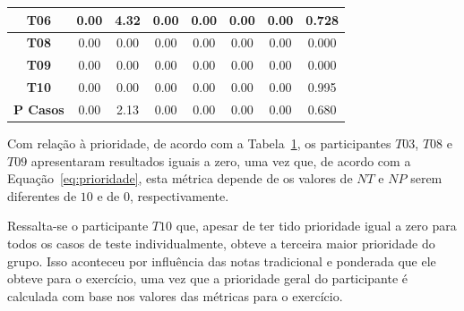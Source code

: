 \begin{table}[htbp]
\begin{tabular}{|c|ccccccc|}
		\textbf{T06} & \multicolumn{1}{c|}{0.00} & \multicolumn{1}{c|}{4.32} & \multicolumn{1}{c|}{0.00} & \multicolumn{1}{c|}{0.00} & \multicolumn{1}{c|}{0.00} & \multicolumn{1}{c|}{0.00} & 0.728 \\ \hline
		\rowcolor[HTML]{F2F2F2} 
		\textbf{T08} & \multicolumn{1}{c|}{\cellcolor[HTML]{F2F2F2}0.00} & \multicolumn{1}{c|}{\cellcolor[HTML]{F2F2F2}0.00} & \multicolumn{1}{c|}{\cellcolor[HTML]{F2F2F2}0.00} & \multicolumn{1}{c|}{\cellcolor[HTML]{F2F2F2}0.00} & \multicolumn{1}{c|}{\cellcolor[HTML]{F2F2F2}0.00} & \multicolumn{1}{c|}{\cellcolor[HTML]{F2F2F2}0.00} & 0.000 \\ \hline
		\textbf{T09} & \multicolumn{1}{c|}{0.00} & \multicolumn{1}{c|}{0.00} & \multicolumn{1}{c|}{0.00} & \multicolumn{1}{c|}{0.00} & \multicolumn{1}{c|}{0.00} & \multicolumn{1}{c|}{0.00} & 0.000 \\ \hline
		\rowcolor[HTML]{F2F2F2} 
		\textbf{T10} & \multicolumn{1}{c|}{\cellcolor[HTML]{F2F2F2}0.00} & \multicolumn{1}{c|}{\cellcolor[HTML]{F2F2F2}0.00} & \multicolumn{1}{c|}{\cellcolor[HTML]{F2F2F2}0.00} & \multicolumn{1}{c|}{\cellcolor[HTML]{F2F2F2}0.00} & \multicolumn{1}{c|}{\cellcolor[HTML]{F2F2F2}0.00} & \multicolumn{1}{c|}{\cellcolor[HTML]{F2F2F2}0.00} & 0.995 \\ \hline
		\rowcolor[HTML]{D0CECE} 
		\textbf{P Casos} & \multicolumn{1}{c|}{\cellcolor[HTML]{D0CECE}0.00} & \multicolumn{1}{c|}{\cellcolor[HTML]{D0CECE}2.13} & \multicolumn{1}{c|}{\cellcolor[HTML]{D0CECE}0.00} & \multicolumn{1}{c|}{\cellcolor[HTML]{D0CECE}0.00} & \multicolumn{1}{c|}{\cellcolor[HTML]{D0CECE}0.00} & \multicolumn{1}{c|}{\cellcolor[HTML]{D0CECE}0.00} & 0.680 \\ \hline
	\end{tabular}
	\label{tab:F3_A3_P}
\end{table}

Com relação à prioridade, de acordo com a Tabela~\ref{tab:F3_A3_P}, os participantes $T03$, $T08$ e $T09$ apresentaram resultados iguais a zero, uma vez que, de acordo com a Equação~\ref{eq:prioridade}, esta métrica depende de os valores de $NT$ e $NP$ serem diferentes de $10$ e de $0$, respectivamente. 

Ressalta-se o participante $T10$ que, apesar de ter tido prioridade igual a zero para todos os casos de teste individualmente, obteve a terceira maior prioridade do grupo. Isso aconteceu por influência das notas tradicional e ponderada que ele obteve para o exercício, uma vez que a prioridade geral do participante é calculada com base nos valores das métricas para o exercício.

